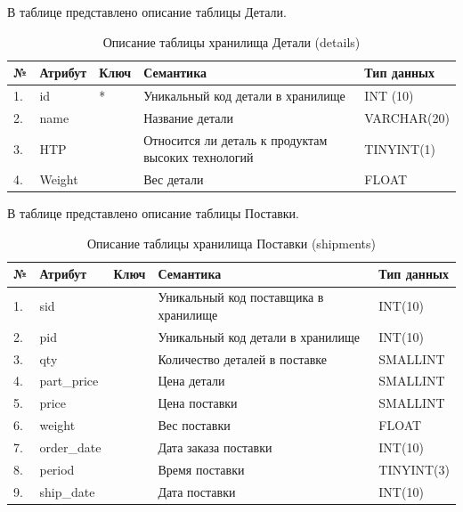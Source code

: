 В таблице  представлено описание таблицы Детали.
\begin{table}[h]
	\caption{\space Описание таблицы хранилища Детали (details)}
	\label{etl-parts}
	\begin{tabular}{|p{0.4cm}|p{2.5cm}|p{1.5cm}|p{6.3cm}|p{3.2cm}|}
		\hline
		\textbf{№} & \textbf{Атрибут} & \textbf{Ключ} & \textbf{Семантика} & \textbf{Тип данных} \\
		\hline
		1. & id & * & Уникальный код детали в хранилище & INT (10) \\
		\hline
		2. & name & & Название детали & VARCHAR(20) \\
		\hline
		3. & HTP & & Относится ли деталь к продуктам высоких технологий & TINYINT(1) \\
		\hline
		4. & Weight & & Вес детали & FLOAT \\
		\hline
	\end{tabular}
\end{table}

В таблице  представлено описание таблицы Поставки.
\begin{table}[h]
	\caption{\space Описание таблицы хранилища Поставки (shipments)}
	\label{etl-shipments}
	\begin{tabular}{|p{0.4cm}|p{2.5cm}|p{1.5cm}|p{6.3cm}|p{3.2cm}|}
		\hline
		\textbf{№} & \textbf{Атрибут} & \textbf{Ключ} & \textbf{Семантика} & \textbf{Тип данных} \\
		\hline
		1. & sid & & Уникальный код поставщика в хранилище & INT(10) \\
		\hline
		2. & pid & & Уникальный код детали в хранилище & INT(10) \\
		\hline
		3. & qty & & Количество деталей в поставке & SMALLINT \\
		\hline
		4. & part\_price & & Цена детали & SMALLINT \\
		\hline
		5. & price & & Цена поставки & SMALLINT \\
		\hline
		6. & weight & & Вес поставки & FLOAT \\
		\hline
		7. & order\_date & & Дата заказа поставки & INT(10) \\
		\hline
		8. & period & & Время поставки & TINYINT(3) \\
		\hline
		9. & ship\_date & & Дата поставки & INT(10) \\
		\hline
	\end{tabular}
\end{table}

